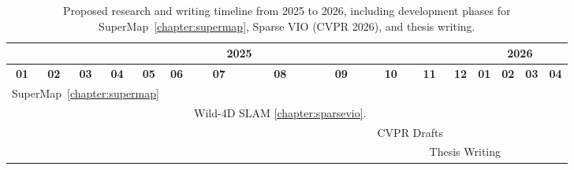 \begin{table}[h]
\begin{center}
\begin{tabular}{|c|c|c|c|c|c|c|c|c|c|c|c|c|c|c|c|}
\hline
\multicolumn{12}{|c|}{\textbf{2025}} & \multicolumn{4}{|c|}{\textbf{2026}} \\ \hline
\textbf{01} & \textbf{02} & \textbf{03} & \textbf{04} & \textbf{05} & \textbf{06} & \textbf{07} & \textbf{08} & \textbf{09} & \textbf{10} & \textbf{11} & \textbf{12} & \textbf{01} & \textbf{02} & \textbf{03} & \textbf{04} \\ \hline

\multicolumn{5}{|c|}{\cellcolor{cyan}SuperMap~\ref{chapter:supermap}} & \multicolumn{11}{c|}{} \\ \hline

\multicolumn{6}{|c|}{} & \multicolumn{3}{c|}{\cellcolor{green!30}Wild-4D SLAM \ref{chapter:sparsevio}.} & \multicolumn{7}{c|}{} \\ \hline

\multicolumn{9}{|c|}{} & \multicolumn{2}{c|}{\cellcolor{yellow!30}CVPR Drafts} & \multicolumn{5}{c|}{} \\ \hline

\multicolumn{10}{|c|}{} & \multicolumn{4}{c|}{\cellcolor{orange!30}Thesis Writing} & \multicolumn{2}{c|}{} \\ \hline

\end{tabular}
\caption[Proposed Timeline]{Proposed research and writing timeline from 2025 to 2026, including development phases for SuperMap~\ref{chapter:supermap}, Sparse VIO (CVPR 2026), and thesis writing.}
\label{tab:proposed_timeline}
\end{center}
\end{table}


